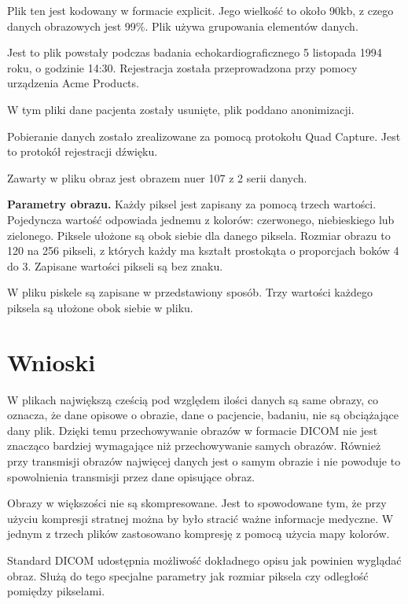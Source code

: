 \documentclass[11pt,a4paper]{article}
\begin{document}
Plik ten jest kodowany w formacie explicit. Jego wielkość to około 90kb, z
czego danych obrazowych jest 99\%. Plik używa grupowania elementów danych.

Jest to plik powstały podczas badania echokardiograficznego 5 listopada 1994 roku, o godzinie 14:30. Rejestracja została przeprowadzona przy pomocy urządzenia Acme Products.

W tym pliki dane pacjenta zostały usunięte, plik poddano anonimizacji.

Pobieranie danych zostało zrealizowane za pomocą protokołu Quad Capture. Jest to protokół rejestracji dźwięku.

Zawarty w pliku obraz jest obrazem nuer 107 z 2 serii danych.

\textbf{Parametry obrazu.} Każdy piksel jest zapisany za pomocą trzech wartości. Pojedyncza wartość odpowiada jednemu z kolorów: czerwonego, niebieskiego lub zielonego. Piksele ułożone są obok siebie dla danego piksela. Rozmiar obrazu to 120 na 256 pikseli, z których każdy ma kształt prostokąta o proporcjach boków 4 do 3. Zapisane wartości pikseli są bez znaku.

W pliku piskele są zapisane w przedstawiony sposób. Trzy wartości każdego piksela są ułożone obok siebie w pliku.

\section{Wnioski}
W plikach największą cześcią pod względem ilości danych są same obrazy, co oznacza, że dane opisowe o obrazie, dane o pacjencie, badaniu, nie są obciążające dany plik. Dzięki temu przechowywanie obrazów w formacie DICOM nie jest znacząco bardziej wymagające niż przechowywanie samych obrazów. Również przy transmisji obrazów najwięcej danych jest o samym obrazie i nie powoduje to spowolnienia transmisji przez dane opisujące obraz.

Obrazy w większości nie są skompresowane. Jest to spowodowane tym, że przy użyciu kompresji stratnej można by było stracić ważne informacje medyczne. W jednym z trzech plików zastosowano kompresję z pomocą użycia mapy kolorów.

Standard DICOM udostępnia możliwość dokładnego opisu jak powinien wyglądać obraz. Służą do tego specjalne parametry jak rozmiar piksela czy odległość pomiędzy pikselami.
\end{document}

